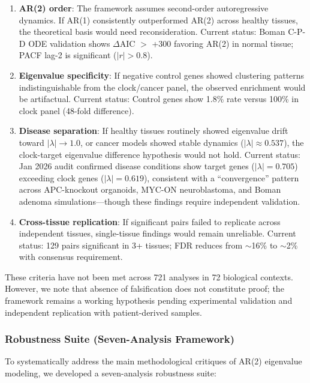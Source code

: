 \documentclass[11pt,a4paper]{article}
\begin{document}
\begin{enumerate}
    \item \textbf{AR(2) order}: The framework assumes second-order autoregressive dynamics. If AR(1) consistently outperformed AR(2) across healthy tissues, the theoretical basis would need reconsideration. Current status: Boman C-P-D ODE validation shows $\Delta$AIC $>$ +300 favoring AR(2) in normal tissue; PACF lag-2 is significant ($|r| > 0.8$).
    
    \item \textbf{Eigenvalue specificity}: If negative control genes showed clustering patterns indistinguishable from the clock/cancer panel, the observed enrichment would be artifactual. Current status: Control genes show 1.8\% rate versus 100\% in clock panel (48-fold difference).
    
    \item \textbf{Disease separation}: If healthy tissues routinely showed eigenvalue drift toward $|\lambda| \to 1.0$, or cancer models showed stable dynamics ($|\lambda| \approx 0.537$), the clock-target eigenvalue difference hypothesis would not hold. Current status: Jan 2026 audit confirmed disease conditions show target genes ($|\lambda| = 0.705$) exceeding clock genes ($|\lambda| = 0.619$), consistent with a ``convergence'' pattern across APC-knockout organoids, MYC-ON neuroblastoma, and Boman adenoma simulations---though these findings require independent validation.
    
    \item \textbf{Cross-tissue replication}: If significant pairs failed to replicate across independent tissues, single-tissue findings would remain unreliable. Current status: 129 pairs significant in 3+ tissues; FDR reduces from $\sim$16\% to $\sim$2\% with consensus requirement.
\end{enumerate}

These criteria have not been met across 721 analyses in 72 biological contexts. However, we note that absence of falsification does not constitute proof; the framework remains a working hypothesis pending experimental validation and independent replication with patient-derived samples.

\subsubsection{Robustness Suite (Seven-Analysis Framework)}

To systematically address the main methodological critiques of AR(2) eigenvalue modeling, we developed a seven-analysis robustness suite:
\end{document}
